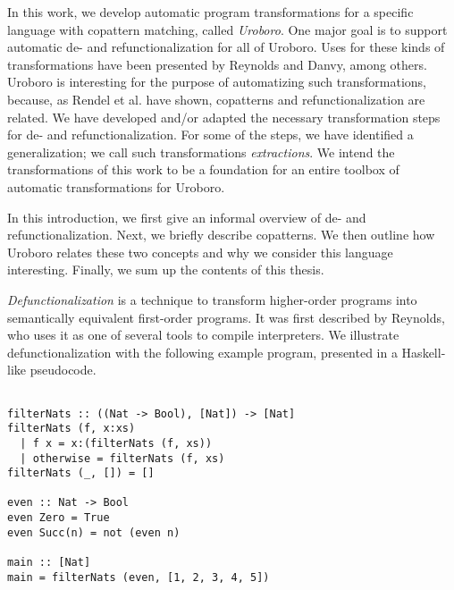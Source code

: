 In this work, we develop automatic program transformations for a specific language with copattern matching, called \textit{Uroboro}. One major goal is to support automatic de- and refunctionalization for all of Uroboro. Uses for these kinds of transformations have been presented by Reynolds and Danvy, among others. Uroboro is interesting for the purpose of automatizing such transformations, because, as Rendel et al.\cite{rendel15automatic} have shown, copatterns and refunctionalization are related. We have developed and/or adapted the necessary transformation steps for de- and refunctionalization. For some of the steps, we have identified a generalization; we call such transformations \textit{extractions}. We intend the transformations of this work to be a foundation for an entire toolbox of automatic transformations for Uroboro.

In this introduction, we first give an informal overview of de- and refunctionalization. Next, we briefly describe copatterns. We then outline how Uroboro relates these two concepts and why we consider this language interesting. Finally, we sum up the contents of this thesis.

\textit{Defunctionalization} is a technique to transform higher-order programs into semantically equivalent first-order programs. It was first described by Reynolds\cite{reynolds72definitional}, who uses it as one of several tools to compile interpreters. We illustrate defunctionalization with the following example program, presented in a Haskell-like pseudocode.

\begin{lstlisting}

filterNats :: ((Nat -> Bool), [Nat]) -> [Nat]
filterNats (f, x:xs)
  | f x = x:(filterNats (f, xs))
  | otherwise = filterNats (f, xs)
filterNats (_, []) = []

even :: Nat -> Bool
even Zero = True
even Succ(n) = not (even n)

main :: [Nat]
main = filterNats (even, [1, 2, 3, 4, 5])

\end{lstlisting}

